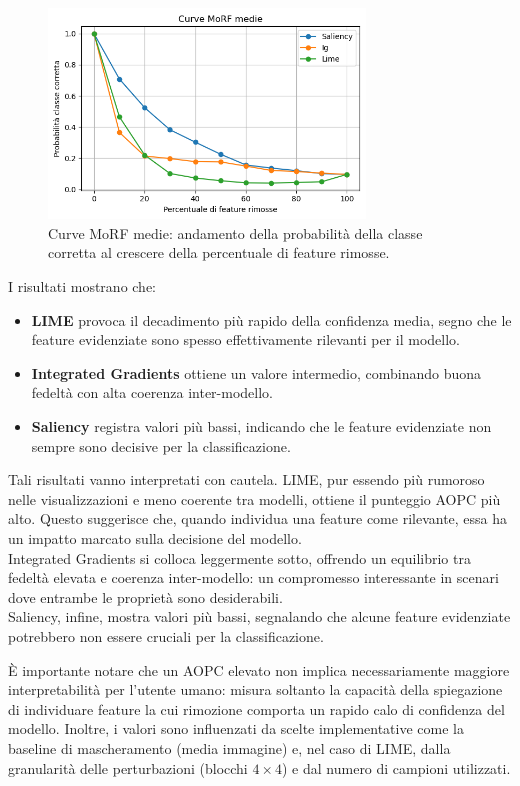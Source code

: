 \documentclass{article}
\begin{document}
\begin{figure}[h!]
    \centering
    \includegraphics[width=0.75\textwidth]{images/grafMorf.png}
    \caption{Curve MoRF medie: andamento della probabilità della classe corretta al crescere della percentuale di feature rimosse.}
    \label{fig:morf_curves}
\end{figure}

\noindent
I risultati mostrano che:
\begin{itemize}
      \item \textbf{LIME} provoca il decadimento più rapido della confidenza media, segno che le feature evidenziate sono spesso effettivamente rilevanti per il modello.
      \item \textbf{Integrated Gradients} ottiene un valore intermedio, combinando buona fedeltà con alta coerenza inter-modello.
      \item \textbf{Saliency} registra valori più bassi, indicando che le feature evidenziate non sempre sono decisive per la classificazione.
\end{itemize}

\noindent
Tali risultati vanno interpretati con cautela. LIME, pur essendo più rumoroso nelle visualizzazioni e meno coerente tra modelli, ottiene il punteggio AOPC più alto. Questo suggerisce che, quando individua una feature come rilevante, essa ha un impatto marcato sulla decisione del modello. \\
Integrated Gradients si colloca leggermente sotto, offrendo un equilibrio tra fedeltà elevata e coerenza inter-modello: un compromesso interessante in scenari dove entrambe le proprietà sono desiderabili. \\
Saliency, infine, mostra valori più bassi, segnalando che alcune feature evidenziate potrebbero non essere cruciali per la classificazione.

È importante notare che un AOPC elevato non implica necessariamente maggiore interpretabilità per l’utente umano: misura soltanto la capacità della spiegazione di individuare feature la cui rimozione comporta un rapido calo di confidenza del modello. Inoltre, i valori sono influenzati da scelte implementative come la baseline di mascheramento (media immagine) e, nel caso di LIME, dalla granularità delle perturbazioni (blocchi $4\times4$) e dal numero di campioni utilizzati.
\end{document}
